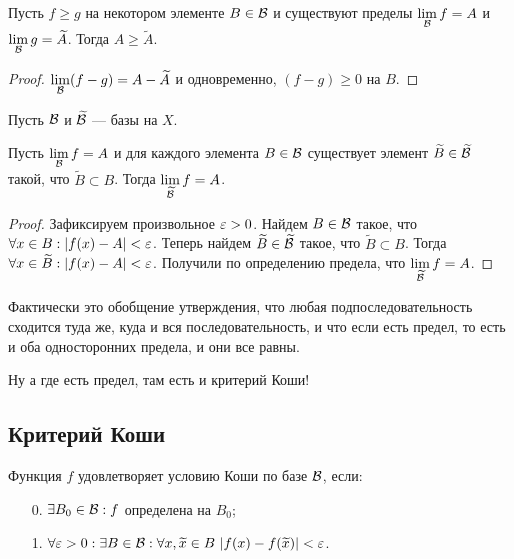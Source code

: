 \documentclass[a4paper, 12pt]{article}
\begin{document}
\begin{Consequence}
Пусть $f \geq g$ на некотором элементе $B \in \mathcal{B}$ и существуют пределы $\lim\limits_{\mathcal{B}}f = A$ и $\lim\limits_{\mathcal{B}}g = \widetilde{A}$. Тогда $A \geq \widetilde{A}$.
\end{Consequence}
\begin{proof}
$\lim\limits_{\mathcal{B}}(f - g) = A - \widetilde{A}$ и одновременно, $(f - g) \geq 0$ на $B$.
\end{proof}

Пусть $\mathcal{B}$ и $\widetilde{\mathcal{B}}$ --- базы на $X$.
\begin{Statement}
Пусть $\lim\limits_{\mathcal{B}}f = A$ и для каждого элемента $B \in \mathcal{B}$ существует элемент $\widetilde{B} \in \widetilde{\mathcal{B}}$ такой, что $\widetilde{B} \subset B$. Тогда $\lim\limits_{\widetilde{\mathcal{B}}}f = A$.
\end{Statement}

\begin{proof}
Зафиксируем произвольное $\varepsilon > 0$. Найдем $B \in \mathcal{B}$ такое, что $\forall x \in B: |f(x) - A| < \varepsilon$.
Теперь найдем $\widetilde{B} \in \widetilde{\mathcal{B}}$ такое, что $\widetilde{B} \subset B$. Тогда $\forall x \in \widetilde{B}: |f(x) - A| < \varepsilon$. Получили по определению предела, что $\lim\limits_{\widetilde{\mathcal{B}}}f = A$.
\end{proof}

Фактически это обобщение утверждения, что любая подпоследовательность сходится туда же, куда и вся последовательность, и что если есть предел, то есть и оба односторонних предела, и они все равны.

Ну а где есть предел, там есть и критерий Коши!

\subsection{Критерий Коши}

\begin{Def}
Функция $f$ удовлетворяет условию Коши по базе $\mathcal{B}$, если:
\begin{itemize}
\item[0.] $\exists B_0 \in \mathcal{B}: f$ определена на $B_0$;
\item[1.] $\forall \varepsilon > 0: \exists B \in \mathcal{B}: \forall x, \widetilde{x} \in B\ |f(x) - f(\widetilde{x})| < \varepsilon$.
\end{itemize}
\end{Def}
\end{document}
